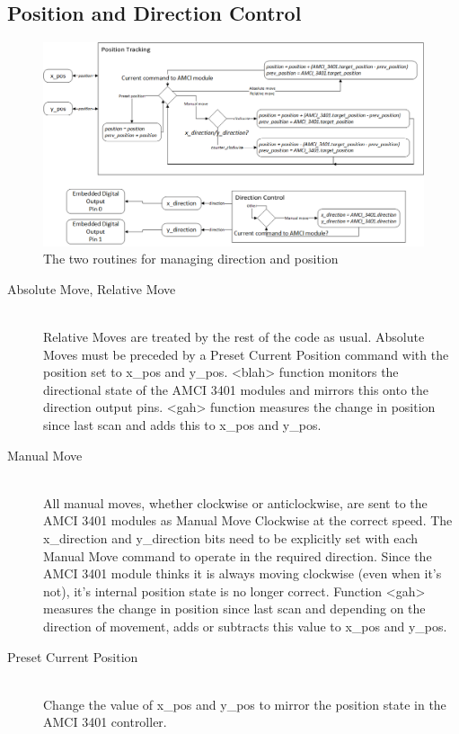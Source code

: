 \subsection{Position and Direction Control}
\label{sec:PLC-flowcharts-pos}

	\begin{figure}[htbp!]
		\includegraphics[width=\textwidth]{figures/cncMachine/position_direction}
		\caption{The two routines for managing direction and position}
		\label{fig:Direction and Positional Tracking}
	\end{figure}
	
				\begin{description}
					\item[Absolute Move, Relative Move] \hfill \\
						Relative Moves are treated by the rest of the code as usual. Absolute Moves must be preceded by a Preset Current Position command with the position set to x\_pos and y\_pos. <blah> function monitors the directional state of the AMCI 3401 modules and mirrors this onto the direction output pins. <gah> function measures the change in position since last scan and adds this to x\_pos and y\_pos.
					\item[Manual Move] \hfill \\
						All manual moves, whether clockwise or anticlockwise, are sent to the AMCI 3401 modules as Manual Move Clockwise at the correct speed. The x\_direction and y\_direction bits need to be explicitly set with each Manual Move command to operate in the required direction. Since the AMCI 3401 module thinks it is always moving clockwise (even when it's not), it's internal position state is no longer correct. Function <gah> measures the change in position since last scan and depending on the direction of movement, adds or subtracts this value to x\_pos and y\_pos.
					\item[Preset Current Position] \hfill \\
						Change the value of x\_pos and y\_pos to mirror the position state in the AMCI 3401 controller.
				\end{description}
				
